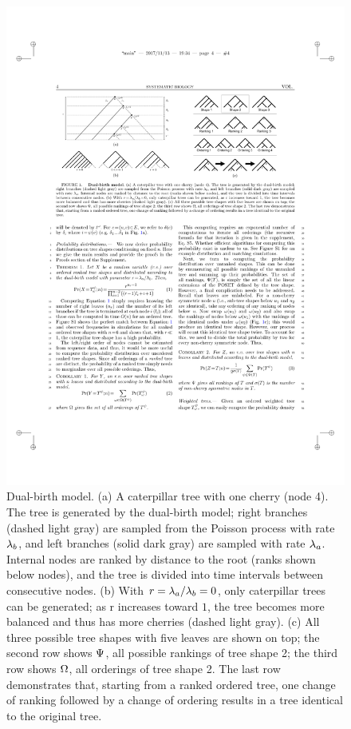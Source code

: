 \begin{figure} %
\centering
\includegraphics[width=\textwidth]{figs/dualbirth-model}
\caption[Dual-birth model]
{Dual-birth model. (a) A caterpillar tree with one cherry (node 4). The tree is generated by the dual-birth model; right branches (dashed light gray) are sampled from the Poisson process with rate $\lambda_b$, and left branches (solid dark gray) are sampled with rate $\lambda_a$. Internal nodes are ranked by distance to the root (ranks shown below nodes), and the tree is divided into time intervals between consecutive nodes. (b) With $r=\lambda_a/\lambda_b=0$, only caterpillar trees can be generated; as r increases toward $1$, the tree becomes more balanced and thus has more cherries (dashed light gray). (c) All three possible tree shapes with five leaves are shown on top; the second row shows $\Psi$, all possible rankings of tree shape 2; the third row shows $\Omega$, all orderings of tree shape 2. The last row demonstrates that, starting from a ranked ordered tree, one change of ranking followed by a change of ordering results in a tree identical to the original tree.}
\label{fig:dualbirth-model}
\end{figure}

